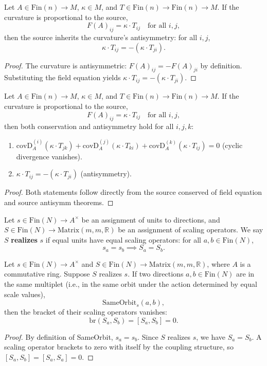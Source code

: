 \begin{theorem}
Let $A \in \text{Fin}(n) \to M$, $\kappa \in M$, and $T \in \text{Fin}(n) \to \text{Fin}(n) \to M$. If the curvature is proportional to the source,
\[
F(A)_{ij} = \kappa \cdot T_{ij} \quad \text{for all } i, j,
\]
then the source inherits the curvature's antisymmetry: for all $i, j$,
\[
\kappa \cdot T_{ij} = -(\kappa \cdot T_{ji}).
\]
\begin{proof}
The curvature is antisymmetric: $F(A)_{ij} = -F(A)_{ji}$ by definition. Substituting the field equation yields $\kappa \cdot T_{ij} = -(\kappa \cdot T_{ji})$.
\end{proof}
\end{theorem}

\begin{theorem}
Let $A \in \text{Fin}(n) \to M$, $\kappa \in M$, and $T \in \text{Fin}(n) \to \text{Fin}(n) \to M$. If the curvature is proportional to the source,
\[
F(A)_{ij} = \kappa \cdot T_{ij} \quad \text{for all } i, j,
\]
then both conservation and antisymmetry hold for all $i, j, k$:
\begin{enumerate}
\item $\text{covD}_A^{(i)}(\kappa \cdot T_{jk}) + \text{covD}_A^{(j)}(\kappa \cdot T_{ki}) + \text{covD}_A^{(k)}(\kappa \cdot T_{ij}) = 0$ (cyclic divergence vanishes).
\item $\kappa \cdot T_{ij} = -(\kappa \cdot T_{ji})$ (antisymmetry).
\end{enumerate}
\begin{proof}
Both statements follow directly from the source conserved of field equation and source antisymm theorems.
\end{proof}
\end{theorem}

\begin{definition}
Let $s \in \text{Fin}(N) \to A^\times$ be an assignment of units to directions, and $S \in \text{Fin}(N) \to \text{Matrix}(m, m, \mathbb{R})$ be an assignment of scaling operators. We say $S$ \textbf{realizes} $s$ if equal units have equal scaling operators: for all $a, b \in \text{Fin}(N)$,
\[
s_a = s_b \implies S_a = S_b.
\]
\end{definition}

\begin{theorem}
Let $s \in \text{Fin}(N) \to A^\times$ and $S \in \text{Fin}(N) \to \text{Matrix}(m, m, \mathbb{R})$, where $A$ is a commutative ring. Suppose $S$ realizes $s$. If two directions $a, b \in \text{Fin}(N)$ are in the same multiplet (i.e., in the same orbit under the action determined by equal scale values),
\[
\text{SameOrbit}_s(a, b),
\]
then the bracket of their scaling operators vanishes:
\[
\text{br}(S_a, S_b) = [S_a, S_b] = 0.
\]
\begin{proof}
By definition of SameOrbit, $s_a = s_b$. Since $S$ realizes $s$, we have $S_a = S_b$. A scaling operator brackets to zero with itself by the coupling structure, so $[S_a, S_b] = [S_a, S_a] = 0$.
\end{proof}
\end{theorem}

